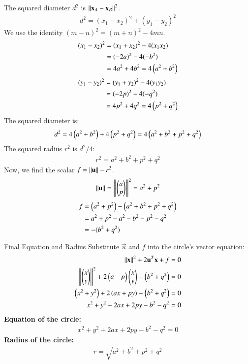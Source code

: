\documentclass[journal]{IEEEtran}
\theoremstyle{remark}
\begin{document}
The squared diameter $d^2$ is $\left\lVert\mathbf{x}_A - \mathbf{x}_B\right\rVert^2$.
\begin{align*}
    d^2 = (x_1 - x_2)^2 + (y_1 - y_2)^2
\end{align*}
We use the identity $(m-n)^2 = (m+n)^2 - 4mn$.
\begin{align*}
    (x_1 - x_2)^2 &= (x_1 + x_2)^2 - 4(x_1 x_2) \\
    &= (-2a)^2 - 4(-b^2) \\
    &= 4a^2 + 4b^2 = 4\left(a^2 + b^2\right)
\end{align*}
\begin{align*}
    (y_1 - y_2)^2 &= (y_1 + y_2)^2 - 4(y_1 y_2) \\
    &= (-2p)^2 - 4(-q^2) \\
    &= 4p^2 + 4q^2 = 4\left(p^2 + q^2\right)
\end{align*}
The squared diameter is:
\begin{align*}
    d^2 = 4\left(a^2 + b^2\right) + 4\left(p^2 + q^2\right) = 4\left(a^2 + b^2 + p^2 + q^2\right)
\end{align*}
The squared radius $r^2$ is $d^2/4$:
\begin{align*}
    r^2 = a^2 + b^2 + p^2 + q^2
\end{align*}
Now, we find the scalar $f = \left\lVert\mathbf{u}\right\rVert - r^2$.
\begin{align*}
    \left\lVert\mathbf{u}\right\rVert = \left\lVert \begin{pmatrix}a \\ p\end{pmatrix}\right\rVert^2 = a^2 + p^2
\end{align*}
\begin{align*}
    f &= \left(a^2 + p^2\right) - \left(a^2 + b^2 + p^2 + q^2\right) \\
    &= a^2 + p^2 - a^2 - b^2 - p^2 - q^2 \\
    &= -(b^2 + q^2)
\end{align*}

Final Equation and Radius
Substitute $\vec{u}$ and $f$ into the circle's vector equation:
\begin{align*}
    \left\lVert\mathbf{x}\right\rVert^2 + 2\mathbf{u}^T \mathbf{x} + f = 0 \\
    \left\lVert\begin{pmatrix}x \\ y\end{pmatrix}\right\rVert^2 + 2 \begin{pmatrix} a & p \end{pmatrix} \begin{pmatrix}x \\ y\end{pmatrix} - \left(b^2 + q^2\right) = 0 \\
    \left(x^2 + y^2\right) + 2\left(ax + py\right) - \left(b^2 + q^2\right) = 0 \\
    x^2 + y^2 + 2ax + 2py - b^2 - q^2 = 0
\end{align*}
\textbf{Equation of the circle:}
\begin{align*}
    x^2 + y^2 + 2ax + 2py - b^2 - q^2 = 0
\end{align*}
\textbf{Radius of the circle:}
\begin{align*}
    r = \sqrt{a^2 + b^2 + p^2 + q^2}
\end{align*}
\end{document}
